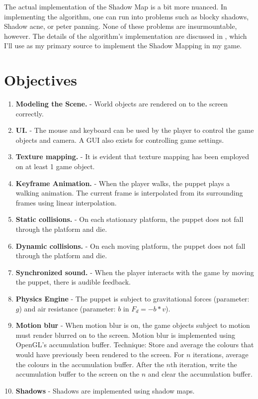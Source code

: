 \documentclass[11pt]{article}
\begin{document}
The actual implementation of the Shadow Map is a bit more nuanced. In implementing the algorithm, one can run into problems such as blocky shadows, Shadow acne, or peter panning. None of these problems are insurmountable, however. The details of the algorithm's implementation are discussed in \cite{shadow-map-learn-opengl}, which I'll use as my primary source to implement the Shadow Mapping in my game.

\printbibliography
\section{Objectives}
\begin{enumerate}
\item \textbf{Modeling the Scene.} - World objects are rendered on to the screen correctly.
\item \textbf{UI.} - The mouse and keyboard can be used by the player to control the game objects and camera. A GUI also exists for controlling game settings. 
\item \textbf{Texture mapping.} - It is evident that texture mapping has been employed on at least 1 game object.
\item \textbf{Keyframe Animation.} - When the player walks, the puppet plays a walking animation. The current frame is interpolated from its surrounding frames using linear interpolation.
\item \textbf{Static collisions.} - On each stationary platform, the puppet does not fall through the platform and die.
\item \textbf{Dynamic collisions.} - On each moving platform, the puppet does not fall through the platform and die.
\item \textbf{Synchronized sound.} - When the player interacts with the game by moving the puppet, there is audible feedback. 
\item \textbf{Physics Engine} - The puppet is subject to gravitational forces (parameter: $g$) and air resistance (parameter: $b$ in $F_d = -b * v$). 
\item \textbf{Motion blur} - When motion blur is on, the game objects subject to motion must render blurred on to the screen. Motion blur is implemented using OpenGL's accumulation buffer. Technique: Store and average the colours that would have previously been rendered to the screen. For $n$ iterations, average the colours in the accumulation buffer. After the $n$th iteration, write the accumulation buffer to the screen on the $n$ and clear the accumulation buffer.
\item \textbf{Shadows} - Shadows are implemented using shadow maps.
\end{enumerate}
\end{document}
